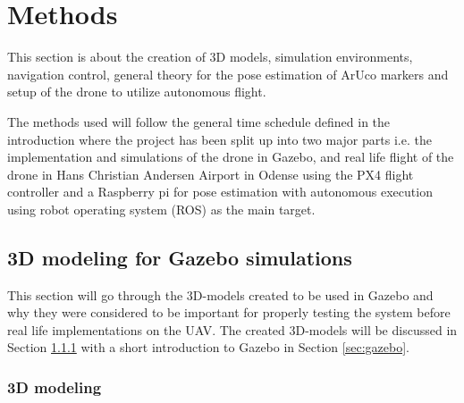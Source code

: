 \documentclass[../Head/report.tex]{subfiles}
\begin{document}


\lstset{style=mystyle}

\section{Methods}
\label{sec:methods}

This section is about the creation of 3D models, simulation environments, navigation control, general theory for the pose estimation of ArUco markers and setup of the drone to utilize autonomous flight.

The methods used will follow the general time schedule defined in the introduction where the project has been split up into two major parts i.e. the implementation and simulations of the drone in Gazebo, and real life flight of the drone in Hans Christian Andersen Airport in Odense using the PX4 flight controller and a Raspberry pi for pose estimation with autonomous execution using robot operating system (ROS) as the main target.

\subsection{3D modeling for Gazebo simulations}
\label{sec:3d_modeling_for_gazebo_simulations}

This section will go through the 3D-models created to be used in Gazebo and why they were considered to be important for properly testing the system before real life implementations on the UAV. The created 3D-models will be discussed in Section \ref{sec:3d_modeling} with a short introduction to Gazebo in Section \ref{sec:gazebo}.

\subsubsection{3D modeling}
\label{sec:3d_modeling}
\end{document}
